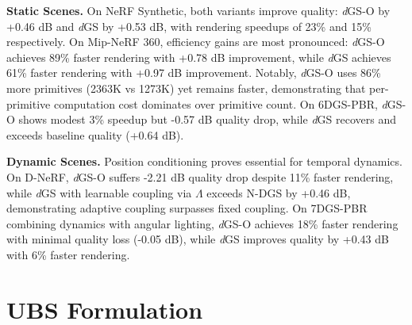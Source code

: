 \documentclass{article}
\makeatletter
\DeclareRobustCommand\onedot{\futurelet\@let@token\@onedot}
\def\@onedot{\ifx\@let@token.\else.\null\fi\xspace}
\def\eg{\emph{e.g}\onedot} \def\Eg{\emph{E.g}\onedot}
\newcommand{\dgs}{\textit{d}GS\xspace}
\theoremstyle{plain}
\theoremstyle{definition}
\theoremstyle{remark}
\makeatother
\begin{document}
\textbf{Static Scenes.}
On NeRF Synthetic, both variants improve quality: \textit{d}GS-O by +0.46 dB and \textit{d}GS by +0.53 dB, with rendering speedups of 23\% and 15\% respectively. On Mip-NeRF 360, efficiency gains are most pronounced: \textit{d}GS-O achieves 89\% faster rendering with +0.78 dB improvement, while \textit{d}GS achieves 61\% faster rendering with +0.97 dB improvement. Notably, \textit{d}GS-O uses 86\% more primitives (2363K vs 1273K) yet remains faster, demonstrating that per-primitive computation cost dominates over primitive count. On 6DGS-PBR, \textit{d}GS-O shows modest 3\% speedup but -0.57 dB quality drop, while \textit{d}GS recovers and exceeds baseline quality (+0.64 dB).

\textbf{Dynamic Scenes.}
Position conditioning proves essential for temporal dynamics. On D-NeRF, \textit{d}GS-O suffers -2.21 dB quality drop despite 11\% faster rendering, while \textit{d}GS with learnable coupling via $\Lambda$ exceeds N-DGS by +0.46 dB, demonstrating adaptive coupling surpasses fixed coupling. On 7DGS-PBR combining dynamics with angular lighting, \textit{d}GS-O achieves 18\% faster rendering with minimal quality loss (-0.05 dB), while \textit{d}GS improves quality by +0.43 dB with 6\% faster rendering.



% 

\section{UBS Formulation}
\label{sec:dbs}
\end{document}
